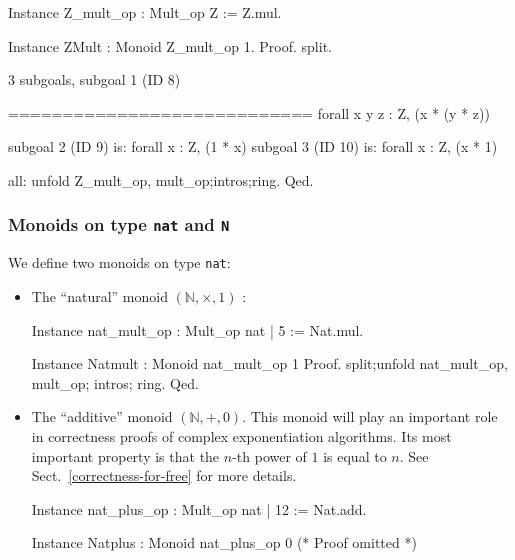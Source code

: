\begin{Coqsrc}
Instance Z_mult_op : Mult_op Z := Z.mul.

Instance ZMult : Monoid  Z_mult_op 1.
Proof. 
  split.
\end{Coqsrc}

\begin{Coqanswer}
3 subgoals, subgoal 1 (ID 8)
  
  ============================
   forall x y z : Z, (x * (y * z))%

subgoal 2 (ID 9) is:
 forall x : Z, (1 * x)%
subgoal 3 (ID 10) is:
 forall x : Z, (x * 1)%
\end{Coqanswer}

\begin{Coqsrc}
    all: unfold Z_mult_op, mult_op;intros;ring.
Qed.
\end{Coqsrc}


\subsubsection{Monoids on type \texttt{nat} and \texttt{N}}
\label{nat-monoids}

We define two monoids on type \texttt{nat}:
\begin{itemize}
\item The ``natural'' monoid $(\mathbb{N},\times, 1)$ :

  \begin{Coqsrc}
Instance nat_mult_op : Mult_op nat | 5 := Nat.mul.

Instance  Natmult : Monoid nat_mult_op  1%
Proof.
   split;unfold nat_mult_op, mult_op; intros; ring.
Qed.
\end{Coqsrc}

\item The ``additive''  monoid $(\mathbb{N},+, 0)$.
This monoid will play an important role in correctness proofs of complex
exponentiation algorithms. Its most important property is that the $n$-th 
power of $1$ is equal to $n$. See Sect.~\vref{correctness-for-free} for more details.

\begin{Coqsrc}
Instance nat_plus_op : Mult_op nat | 12 := Nat.add.

Instance Natplus : Monoid nat_plus_op  0%
(* Proof omitted *)
\end{Coqsrc}
\end{itemize}

